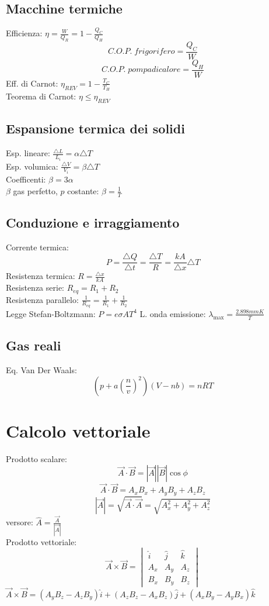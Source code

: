 \documentclass{article}
\begin{document}
\begin{small}
\begin{multicols}{3}
	\subsection{Macchine termiche}
		Efficienza: $ \eta = \frac{ W }{ Q_R } = 1 - \frac{ Q_C }{ Q_H } $
		\[ C.O.P. \; frigorifero = \frac{ Q_C }{ W } \]
		\[ C.O.P. \; pompa di calore = \frac{ Q_H }{ W } \]
		Eff. di Carnot: $ \eta_{REV} = 1 - \frac{ T_C }{ T_H } $ \\
		Teorema di Carnot: $ \eta \leq \eta_{REV} $
	\subsection{Espansione termica dei solidi}
		Esp. lineare: $ \frac{ \triangle L }{ L_i } = \alpha \triangle T $ \\
		Esp. volumica: $ \frac{ \triangle V }{ V_i } = \beta \triangle T $ \\
		Coefficenti: $ \beta = 3 \alpha $ \\
		$\beta$ gas perfetto, $p$ costante: $ \beta = \frac{1}{ T } $
	\subsection{Conduzione e irraggiamento}
		Corrente termica: \[ P = \frac{ \triangle Q }{ \triangle t } = \frac{ \triangle T }{ R } = \frac{ k A }{ \triangle x } \triangle T \]
		Resistenza termica: $ R = \frac{ \triangle x }{ k A } $ \\
		Resistenza serie: $ R_{eq} = R_1 + R_2 $ \\
		Resistenza parallelo: $ \frac{1}{ R_{eq} } = \frac{1}{ R_1 } + \frac{1}{ R_2 } $ \\
		Legge Stefan-Boltzmann: $ P = e \sigma A T^4 $
		L. onda emissione: $ \lambda_{\max} = \frac{ 2.898 mmK }{ T } $
	\subsection{Gas reali}
		Eq. Van Der Waals: \[ ( p + a ( \frac{ n }{ v } )^2 ) ( V - n b ) = n R T \]
\section{Calcolo vettoriale}
		Prodotto scalare:
		\[ \vec A \cdot \vec B = | \vec A | | \vec B | \cos \phi \]
		\[ \vec A \cdot \vec B = A_x B_x + A_y B_y + A_z B_z \]
		\[ | \vec A | = \sqrt{ \vec A \cdot \vec A } = \sqrt{ A_x^2 + A_y^2 + A_z^2 } \]
		versore: $ \hat A = \frac{ \vec A }{ | \vec A | } $ \\
		Prodotto vettoriale:
		\[ \vec A \times \vec B = \begin{vmatrix} \hat i & \hat j & \hat k \\ A_x & A_y & A_z \\ B_x & B_y & B_z \end{vmatrix} \]
		$ \vec A \times \vec B = ( A_y B_z - A_z B_y ) \hat i + ( A_z B_z - A_x B_z ) \hat j + ( A_x B_y - A_y B_x ) \hat k $

\end{multicols}
\end{small}
\end{document}
